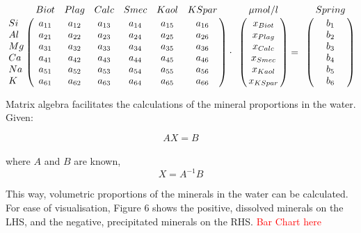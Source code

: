 \begin{center}
\[
  \begin{bordermatrix}
{ & Biot & Plag & Calc & Smec & Kaol & KSpar \cr
Si  & a_{11}  & a_{12}  & a_{13}  & a_{14}  & a_{15}  & a_{16}  \cr
Al  & a_{21}  & a_{22}  & a_{23}  & a_{24}  & a_{25}  & a_{26}  \cr
Mg  & a_{31}  & a_{32}  & a_{33}  & a_{34}  & a_{35}  & a_{36}  \cr
Ca  & a_{41}  & a_{42}  & a_{43}  & a_{44}  & a_{45}  & a_{46}  \cr
Na  & a_{51}  & a_{52}  & a_{53}  & a_{54}  & a_{55}  & a_{56}  \cr
K   & a_{61}  & a_{62}  & a_{63}  & a_{64}  & a_{65}  & a_{66}  \cr}
  \end{bordermatrix}
  \cdot
  \begin{bordermatrix}
{ & \mu mol/l \cr
  & x_{Biot} \cr
  & x_{Plag} \cr
  & x_{Calc} \cr
  & x_{Smec} \cr
  & x_{Kaol} \cr
  & x_{KSpar} \cr}
  \end{bordermatrix}
  =
  \begin{bordermatrix}
{ & Spring \cr
  & b_1 \cr
  & b_2 \cr
  & b_3 \cr
  & b_4 \cr
  & b_5 \cr
  & b_6 \cr}
  \end{bordermatrix}
\]
\end{center}
\bsk




Matrix algebra facilitates the calculations of the mineral proportions in the water. Given:

\begin{equation}
AX = B
\end{equation}\\

where \( A \) and \( B \) are known,\\

\begin{equation}
X = A^{-1}B
\end{equation}

\newpage

This way, volumetric proportions of the minerals in the water can be calculated. For ease of visualisation, Figure 6 shows the positive, dissolved minerals on the LHS, and the negative, precipitated minerals on the RHS. \textcolor{red}{Bar Chart here}\\

